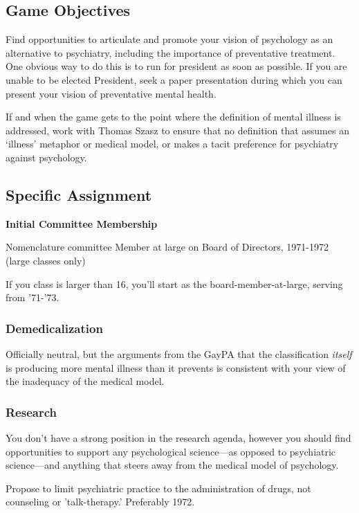 \begin{refsection}
\section{Game Objectives}
\label{gameobjectives}

Find opportunities to articulate and promote your vision of psychology as an alternative to psychiatry, including the importance of preventative treatment. One obvious way to do this is to run for president as soon as possible. If you are unable to be elected President, seek a paper presentation during which you can present your vision of preventative mental health.

If and when the game gets to the point where the definition of mental illness is addressed, work with Thomas Szasz to ensure that no definition that assumes an ‘illness’ metaphor or medical model, or makes a tacit preference for psychiatry against psychology.

\subsection{Specific Assignment}
\label{specificassignment}

\textbf{Initial Committee Membership}
\begin{service}[Albee]\label{service:albee}
Nomenclature committee
Member at large on Board of Directors, 1971-1972 (large classes only)
\end{service}
If you class is larger than 16, you'll start as the board-member-at-large, serving from '71-'73.

\subsubsection{Demedicalization}
\label{demedicalization}

Officially neutral, but the arguments from the GayPA that the classification \emph{itself} is producing more mental illness than it prevents is consistent with your view of the inadequacy of the medical model.

\subsubsection{Research}
\label{research}

You don’t have a strong position in the research agenda, however you should find opportunities to support any psychological science---as opposed to psychiatric science---and anything that steers away from the medical model of psychology.
\begin{proposal}[Albee]\label{proposal:albee}
Propose to limit psychiatric practice to the administration of drugs, not counseling or 'talk-therapy.' Preferably 1972.
\end{proposal}


\end{refsection}

